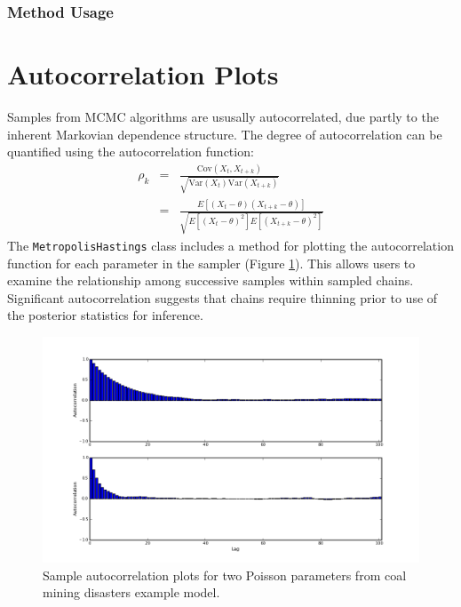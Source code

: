\documentclass[]{book}
\begin{document}
\subsubsection{Method Usage}
\section{Autocorrelation Plots}

Samples from MCMC algorithms are ususally autocorrelated, due partly to the inherent Markovian dependence structure. The degree of autocorrelation can be quantified using the autocorrelation function:
\begin{eqnarray*}
    \rho_k &=& \frac{\mbox{Cov}(X_t, X_{t+k})}{\sqrt{\mbox{Var}(X_t)\mbox{Var}(X_{t+k})}} \\
            &=& \frac{E[(X_t - \theta)(X_{t+k} - \theta)]}{\sqrt{E[(X_t - \theta)^2] E[(X_{t+k} - \theta)^2]}}
\end{eqnarray*}
The \verb=MetropolisHastings= class includes a method for plotting the autocorrelation function for each parameter in the sampler (Figure \ref{fig:autocorr}). This allows users to examine the relationship among successive samples within sampled chains. Significant autocorrelation suggests that chains require thinning prior to use of the posterior statistics for inference.

\begin{figure}[htbp]
        \begin{center}
        \includegraphics[scale=0.4]{autocorr.png}
    \end{center}
    \caption{Sample autocorrelation plots for two Poisson parameters from coal mining disasters example model.}
    \label{fig:autocorr}
\end{figure}
\end{document}
